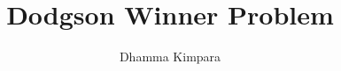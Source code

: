 \documentclass{article}
\theoremstyle{definition}
\begin{document}
\title{Dodgson Winner Problem}
 \author{Dhamma Kimpara}

\maketitle









\newpage




\newpage

\appendix


\end{document}
